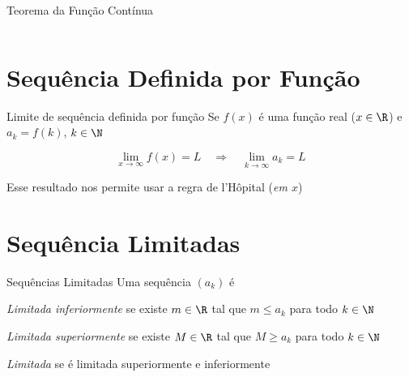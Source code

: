 \documentclass[fleqn,utf8,aspectratio=169,12pt]{beamer}
\begin{document}
\begin{frame}{Teorema da Função Contínua}
  \begin{columns}
    \centerline{\scalebox{0.8}{}} \pause
    \centerline{\scalebox{0.8}{}}
  \end{columns}
\end{frame}



\section{Sequência Definida por Função}

\begin{frame}{Limite de sequência definida por função}
  Se $f(x)$ é uma função real ($x\in\R$) \; e \; \(a_k = f(k)\), \(k\in\N\)

  \pause
  \[
   	\lim_{x\to\infty} f(x) = L
    \quad \Rightarrow \quad
    \lim_{k\to\infty} a_k = L
  \]

  \pause
  \vspace{\baselineskip}
  Esse resultado nos permite usar a regra de l'Hôpital (\emph{em $x$})
\end{frame}



\section{Sequência Limitadas}

\begin{frame}{Sequências Limitadas}
	Uma sequência $(a_k)$ é

	\pause
  \bigskip
	\emph{Limitada inferiormente} \tabto{50mm} se existe $m\in\R$ tal que \emph{$m\leq a_k$} para todo $k\in\N$

	\pause
	\bigskip
  \emph{Limitada superiormente} \tabto{50mm} se existe $M\in\R$ tal que \emph{$M\geq a_k$} para todo $k\in\N$

	\pause
	\bigskip
	\emph{Limitada}               \tabto{50mm} se é limitada superiormente e inferiormente

\end{frame}
\end{document}
